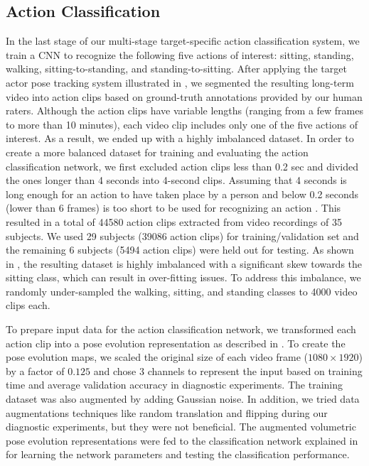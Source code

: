 \subsection{Action Classification} \label{sec:actionresult}
\dataDist
\accuracy
In the last stage of our multi-stage target-specific action classification system, we train a CNN to recognize the following five actions of interest: sitting, standing, walking, sitting-to-standing, and standing-to-sitting. After applying the target actor pose tracking system illustrated in , we segmented the resulting long-term video into action clips based on ground-truth annotations provided by our human raters. Although the action clips have variable lengths (ranging from a few frames to more than 10 minutes), each video clip includes only one of the five actions of interest. As a result, we ended up with a highly imbalanced dataset. In order to create a more balanced dataset for training and evaluating the action classification network, we first excluded action clips less than 0.2 sec and divided the ones longer than 4 seconds into 4-second clips. Assuming that 4 seconds is long enough for an action to have taken place by a person and below 0.2 seconds (lower than 6 frames) is too short to be used for recognizing an action \cite{barrouillet2004time}.  This resulted in a total of 44580 action clips extracted from video recordings of 35 subjects. We used 29 subjects (39086 action clips) for training/validation set and the remaining 6 subjects (5494 action clips) were held out for testing. As shown in , the resulting dataset is highly imbalanced with a significant skew towards the sitting class, which can result in over-fitting issues. To address this imbalance, we randomly under-sampled the walking, sitting, and standing classes to 4000 video clips each.

To prepare input data for the action classification network, we transformed each action clip into a pose evolution representation as described in . To create the pose evolution maps, we scaled the original size of each video frame ($1080 \times 1920$) by a factor of $0.125$ and chose $3$ channels to represent the input based on training time and average validation accuracy in diagnostic experiments. The training dataset was also augmented by adding Gaussian noise. In addition, we tried data augmentations techniques like random translation and flipping during our diagnostic experiments, but they were not beneficial. The augmented volumetric pose evolution representations were fed to the classification network explained in  for learning the network parameters and testing the classification performance.

